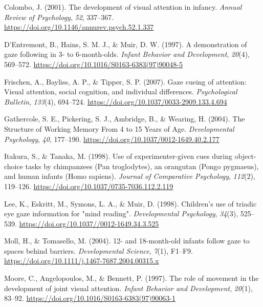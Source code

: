 \documentclass[
  man,floatsintext]{apa6}
\newlength{\cslhangindent}
\newlength{\cslentryspacingunit} %
\newenvironment{CSLReferences}[2] %
 {%
  \setlength{\parindent}{0pt}
  \ifodd #1
  \let\oldpar\par
  \def\par{\hangindent=\cslhangindent\oldpar}
  \fi
  \setlength{\parskip}{#2\cslentryspacingunit}
 }%
 {}
\begin{document}
\begin{CSLReferences}{1}{0}
\leavevmode{}%
Colombo, J. (2001). The development of visual attention in infancy. \emph{Annual Review of Psychology}, \emph{52}, 337--367. \url{https://doi.org/10.1146/annurev.psych.52.1.337}

\leavevmode{}%
D'Entremont, B., Hains, S. M. J., \& Muir, D. W. (1997). A demonstration of gaze following in 3- to 6-month-olds. \emph{Infant Behavior and Development}, \emph{20}(4), 569--572. \url{https://doi.org/10.1016/S0163-6383(97)90048-5}

\leavevmode{}%
Frischen, A., Bayliss, A. P., \& Tipper, S. P. (2007). Gaze cueing of attention: {Visual} attention, social cognition, and individual differences. \emph{Psychological Bulletin}, \emph{133}(4), 694--724. \url{https://doi.org/10.1037/0033-2909.133.4.694}

\leavevmode{}%
Gathercole, S. E., Pickering, S. J., Ambridge, B., \& Wearing, H. (2004). The {Structure} of {Working Memory From} 4 to 15 {Years} of {Age}. \emph{Developmental Psychology}, \emph{40}, 177--190. \url{https://doi.org/10.1037/0012-1649.40.2.177}

\leavevmode{}%
Itakura, S., \& Tanaka, M. (1998). Use of experimenter-given cues during object-choice tasks by chimpanzees ({Pan} troglodytes), an orangutan ({Pongo} pygmaeus), and human infants ({Homo} sapiens). \emph{Journal of Comparative Psychology}, \emph{112}(2), 119--126. \url{https://doi.org/10.1037/0735-7036.112.2.119}

\leavevmode{}%
Lee, K., Eskritt, M., Symons, L. A., \& Muir, D. (1998). Children's use of triadic eye gaze information for "mind reading". \emph{Developmental Psychology}, \emph{34}(3), 525--539. \url{https://doi.org/10.1037//0012-1649.34.3.525}

\leavevmode{}%
Moll, H., \& Tomasello, M. (2004). 12- and 18-month-old infants follow gaze to spaces behind barriers. \emph{Developmental Science}, \emph{7}(1), F1--F9. \url{https://doi.org/10.1111/j.1467-7687.2004.00315.x}

\leavevmode{}%
Moore, C., Angelopoulos, M., \& Bennett, P. (1997). The role of movement in the development of joint visual attention. \emph{Infant Behavior and Development}, \emph{20}(1), 83--92. \url{https://doi.org/10.1016/S0163-6383(97)90063-1}


\end{CSLReferences}
\end{document}
